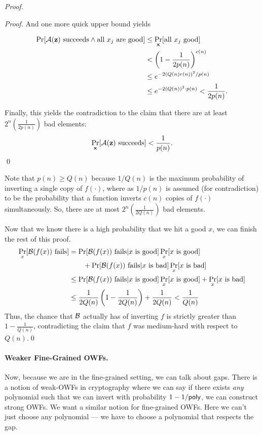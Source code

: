 \begin{proof}
\begin{proof}
		
		And one more quick upper bound yields
		
		\begin{align*}
	\Pr[\mathcal{A}(\mathbf z) \mbox{ succeeds} \land \mbox{all } x_j \mbox{ are good}] &\le \Pr_{\mathbf x}[\mbox{all $x_j$ good}]\\
	&< \left(1 - \frac{1}{2p(n)}\right)^{c(n)}\\
	&\leq e^{-2\left(Q(n)r(n)\right)^2 / p(n)}\\
	&\leq e^{- 2\left(Q(n)\right)^2 \cdot p(n)} < \frac 1 {2p(n)}.
		\end{align*}
		
		Finally, this yields the contradiction to the claim that there are at least $2^n(\frac{1}{2p(n)})$ bad elements:
		\begin{align*}
		\Pr_{\mathbf x}[\mathcal{A}(\mathbf z) \mbox{ succeeds}] < \frac{1}{p(n)}.
		\end{align*}\qed
	\end{proof}

	Note that $p(n)\geq Q(n)$ because $1/Q(n)$ is the maximum probability of inverting a single copy of $f(\cdot)$, where as $1/p(n)$ is assumed (for contradiction) to be the probability that a function inverts $c(n)$ copies of $f(\cdot)$ simultaneously. So, there are at most $2^n(\frac{1}{2Q(n)})$ bad elements.

	Now that we know there is a high probability that we hit a good $x$, we can finish the rest of this proof.
	\begin{align*}
	\Pr_{x}[{\cal B}(f(x)) \mbox{ fails}] &= \Pr[{\cal B}(f(x)) \mbox{ fails} | x \mbox{ is good}] \Pr_x[x \mbox{ is good}]\\
	&\qquad + \Pr[{\cal B}(f(x)) \mbox{ fails} | x \mbox{ is bad}] \Pr_x[x \mbox{ is bad}]\\
	&\le\Pr[{\cal B}(f(x)) \mbox{ fails} | x \mbox{ is good}] \Pr_x[x \mbox{ is good}] + \Pr_x[x \mbox{ is bad}]\\
	&\le \frac{1}{2Q(n)}\left(1 - \frac 1 {2Q(n)}\right) + \frac{1}{2Q(n)} < \frac 1 {Q(n)}
	\end{align*}
	Thus, the chance that ${\cal B}$ actually has of inverting $f$ is strictly greater than $1 - \frac 1 {Q(n)}$, contradicting the claim that $f$ was medium-hard with respect to $Q(n)$.\qed
\end{proof}

\paragraph{Weaker Fine-Grained OWFs.} Now, because we are in the fine-grained setting, we can talk about gaps. There is a notion of weak-OWFs in cryptography where we can say if there exists \emph{any} polynomial such that we can invert with probability $1 - 1/\mathsf{poly}$, we can construct strong OWFs. We want a similar notion for fine-grained OWFs. Here we can't just choose any polynomial --- we have to choose a polynomial that respects the gap.

